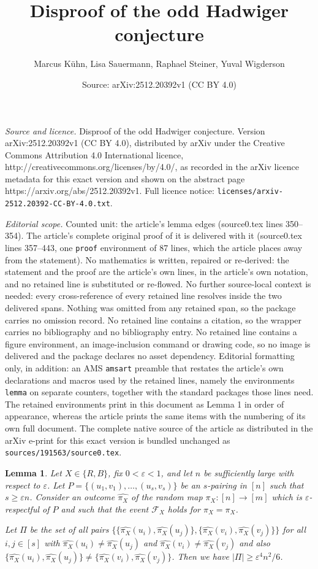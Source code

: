 \documentclass[10pt,a4paper]{amsart}
\title{Disproof of the odd Hadwiger conjecture}
\author{Marcus K\"uhn, Lisa Sauermann, Raphael Steiner, Yuval Wigderson}
\date{Source: arXiv:2512.20392v1 (CC BY 4.0)}
\newtheorem{lemma}{Lemma}
\newcommand{\eps}{\varepsilon}
\newcommand\wh[1]{\widehat{#1}}
\begin{document}
\maketitle

\noindent\emph{Source and licence.} Disproof of the odd Hadwiger conjecture. Version arXiv:2512.20392v1 (CC BY 4.0), distributed by arXiv under the Creative Commons Attribution 4.0 International licence, http://creativecommons.org/licenses/by/4.0/, as recorded in the arXiv licence metadata for this exact version and shown on the abstract page https://arxiv.org/abs/2512.20392v1. Full licence notice: \texttt{licenses/arxiv-2512.20392-CC-BY-4.0.txt}.\par\smallskip

\noindent\textit{Editorial scope.} Counted unit: the article's lemma edges (source0.tex lines 350--354). The article's complete original proof of it is delivered with it (source0.tex lines 357--443, one \texttt{proof} environment of 87 lines, which the article places away from the statement). No mathematics is written, repaired or re-derived: the statement and the proof are the article's own lines, in the article's own notation, and no retained line is substituted or re-flowed.  No further source-local context is needed: every cross-reference of every retained line resolves inside the two delivered spans.  Nothing was omitted from any retained span, so the package carries no omission record.  No retained line contains a citation, so the wrapper carries no bibliography and no bibliography entry.  No retained line contains a figure environment, an image-inclusion command or drawing code, so no image is delivered and the package declares no asset dependency.  Editorial formatting only, in addition: an AMS \texttt{amsart} preamble that restates the article's own declarations and macros used by the retained lines, namely the environments \texttt{lemma} on separate counters, together with the standard packages those lines need.  The retained environments print in this document as Lemma 1 in order of appearance, whereas the article prints the same items with the numbering of its own full document.  The complete native source of the article as distributed in the arXiv e-print for this exact version is bundled unchanged as \texttt{sources/191563/source0.tex}.
\begin{lemma}\label{lem:respectful yields many edges}
	Let $X\in \{R,B\}$, fix $0<\varepsilon<1$, and let $n$ be sufficiently large with respect to $\eps$. Let $P=\{(u_1,v_1),\dots,(u_{s},v_{s})\}$ be an $s$-pairing in $[n]$ such that $s\geq \eps n$. Consider an outcome $\wh{\pi_X}$ of the random map $\pi_X:[n] \to [m]$ which is $\varepsilon$-respectful of $P$ and such that the event $\mathcal F_X$ holds for $\pi_X=\wh{\pi_X}$.
    
    Let $\Pi$ be the set of all pairs $\big\{\{\wh{\pi_X}(u_i),\wh{\pi_X}(u_j)\}, \{\wh{\pi_X}(v_i),\wh{\pi_X}(v_j)\}\big\}$ for all $i,j\in [s]$ with $\wh{\pi_X}(u_i)\ne \wh{\pi_X}(u_j)$ and $\wh{\pi_X}(v_i)\ne \wh{\pi_X}(v_j)$ and also $\{\wh{\pi_X}(u_i),\wh{\pi_X}(u_j)\}\ne \{\wh{\pi_X}(v_i),\wh{\pi_X}(v_j)\}$. Then we have $|\Pi|\geq \eps^4n^2/6$.
\end{lemma}
\end{document}
